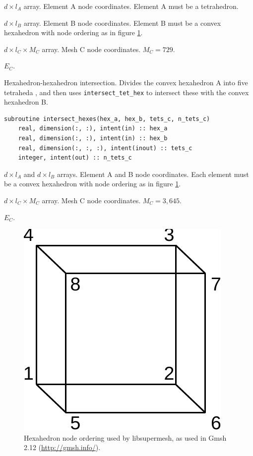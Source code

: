 \documentclass{article}
\begin{document}
\begin{description}[font=\ttfamily\bfseries,leftmargin=2.2\parindent,labelindent=1.7\parindent,noitemsep]
  \item[tet\_a] $d \times l_A$ array. Element A node coordinates. Element A must
    be a tetrahedron.
  \item[hex\_b] $d \times l_B$ array. Element B node coordinates. Element B must
    be a convex hexahedron with node ordering as in figure
    \ref{fig:hex_ordering}.
  \item[tets\_c] $d \times l_C \times M_C$ array. Mesh C node coordinates.
    $M_C = 729$.
  \item[n\_tets\_c] $E_C$.
\end{description}

\noindent Hexahedron-hexahedron intersection. Divides the convex hexahedron A
into five tetraheda \citep[as in][figure 2.29]{wenger2013}, and then uses
\verb+intersect_tet_hex+ to intersect these with the convex hexahedron B.

\begin{lstlisting}[language=FORTRAN]
  subroutine intersect_hexes(hex_a, hex_b, tets_c, n_tets_c)
    real, dimension(:, :), intent(in) :: hex_a
    real, dimension(:, :), intent(in) :: hex_b
    real, dimension(:, :, :), intent(inout) :: tets_c
    integer, intent(out) :: n_tets_c
\end{lstlisting}

\begin{description}[font=\ttfamily\bfseries,leftmargin=2.2\parindent,labelindent=1.7\parindent,noitemsep]
  \item[hex\_a, hex\_b] $d \times l_A$ and $d \times l_B$ arrays. Element A and
    B node coordinates. Each element must be a convex hexahedron with node
    ordering as in figure \ref{fig:hex_ordering}.
  \item[tets\_c] $d \times l_C \times M_C$ array. Mesh C node coordinates.
    $M_C = 3,645$.
  \item[n\_tets\_c] $E_C$.
\end{description}

\begin{figure}\begin{centering}
  \includegraphics[height=0.25\textwidth]{doc/hex_ordering}
  \caption{Hexahedron node ordering used by libsupermesh, as used in
           Gmsh 2.12 (\url{http://gmsh.info/}).}\label{fig:hex_ordering}
\end{centering}\end{figure}
\end{document}
